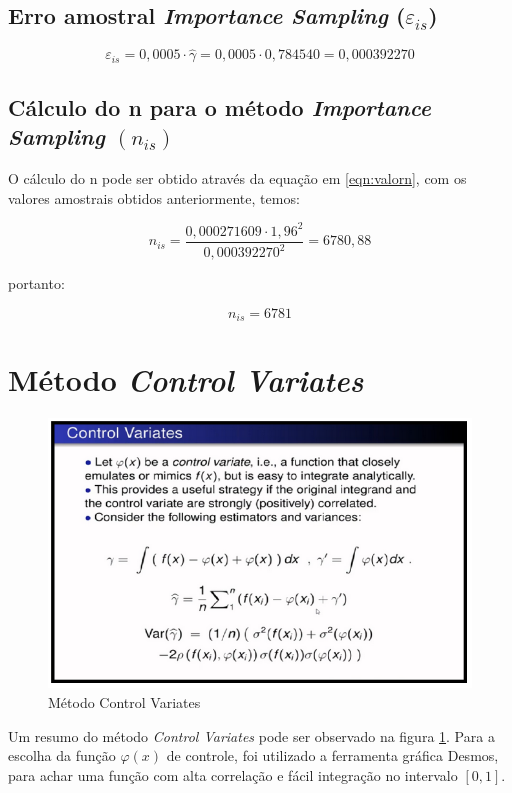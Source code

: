 \documentclass{article}
\begin{document}
\subsection{Erro amostral \textit{Importance Sampling} ($\varepsilon_{is}$)}

\begin{equation*}
    \varepsilon_{is} = 0,0005\cdot\hat{\gamma} = 0,0005\cdot0,784540 = 0,000392270
\end{equation*}

\subsection{Cálculo do n para o método \textit{Importance Sampling} $(n_{is})$}

O cálculo do n pode ser obtido através da equação em \ref{eqn:valorn}, com os valores amostrais obtidos anteriormente, temos:

\begin{equation*}
    n_{is} = \frac{0,000271609\cdot1,96^2}{0,000392270^2} = 6780,88
\end{equation*}

portanto:

\[
    n_{is} = 6781
\]



\section{Método \textit{Control Variates}}

\begin{figure}[H]
    \centering
    \includegraphics[width=.7\linewidth]{Imagens/MC_ControlVariates.png}
    \caption{Método Control Variates}
    \label{fig:ControlVar}
\end{figure}

Um resumo do método \textit{Control Variates} pode ser observado na figura \ref{fig:ControlVar}.
\newline
Para a escolha da função $\varphi(x)$ de controle, foi utilizado a ferramenta gráfica Desmos\cite{desmos}, para achar uma função com alta correlação e fácil integração no intervalo $[0,1]$.
\end{document}
